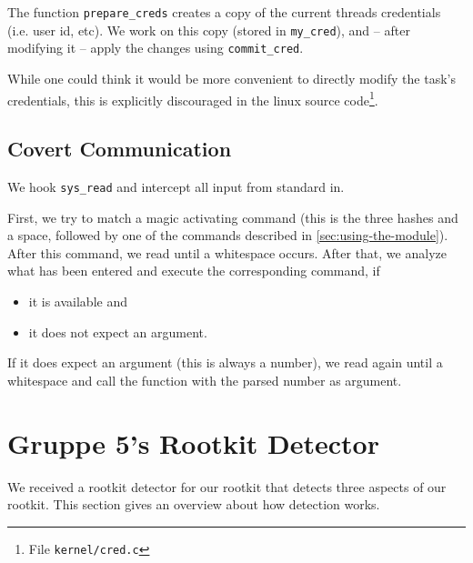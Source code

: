 \documentclass[10pt, letterpaper]{article}
\begin{document}
The function \texttt{prepare\_creds} creates a copy of the current threads credentials (i.e. user id, etc). We work on this copy (stored in \texttt{my\_cred}), and -- after modifying it -- apply the changes using \texttt{commit\_cred}.

While one could think it would be more convenient to directly modify the task's credentials, this is explicitly discouraged in the linux source code\footnote{File \texttt{kernel/cred.c}}.

\subsection{Covert Communication}
We hook \texttt{sys\_read} and intercept all input from standard in. 

First, we try to match a magic activating command (this is the three hashes and a space, followed by one of the commands described in \autoref{sec:using-the-module}). After this command, we read until a whitespace occurs. After that, we analyze what has been entered and execute the corresponding command, if 

\begin{itemize}
 \item it is available and
 \item it does not expect an argument.
\end{itemize}

If it does expect an argument (this is always a number), we read again until a whitespace and call the function with the parsed number as argument.

\section{Gruppe 5's Rootkit Detector}
\label{sec:detectorofgruppe5}

We received a rootkit detector for our rootkit that detects three aspects of our rootkit. This section gives an overview about how detection works.
\end{document}

